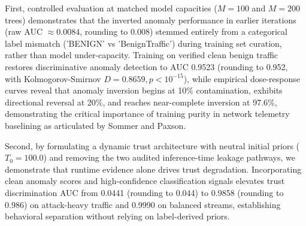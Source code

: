 \documentclass[journal,10pt,onecolumn]{IEEEtran}
\begin{document}
First, controlled evaluation at matched model capacities ($M=100$ and $M=200$ trees) demonstrates that the inverted anomaly performance in earlier iterations (raw AUC $\approx 0.0084$, rounding to 0.008) stemmed entirely from a categorical label mismatch ('BENIGN' vs 'BenignTraffic') during training set curation, rather than model under-capacity. Training on verified clean benign traffic restores discriminative anomaly detection to AUC 0.9523 (rounding to 0.952, with Kolmogorov-Smirnov $D = 0.8659, p < 10^{-15}$), while empirical dose-response curves reveal that anomaly inversion begins at 10\% contamination, exhibits directional reversal at 20\%, and reaches near-complete inversion at 97.6\%, demonstrating the critical importance of training purity in network telemetry baselining as articulated by Sommer and Paxson.

Second, by formulating a dynamic trust architecture with neutral initial priors ($T_0 = 100.0$) and removing the two audited inference-time leakage pathways, we demonstrate that runtime evidence alone drives trust degradation. Incorporating clean anomaly scores and high-confidence classification signals elevates trust discrimination AUC from 0.0441 (rounding to 0.044) to 0.9858 (rounding to 0.986) on attack-heavy traffic and 0.9990 on balanced streams, establishing behavioral separation without relying on label-derived priors.
\end{document}
